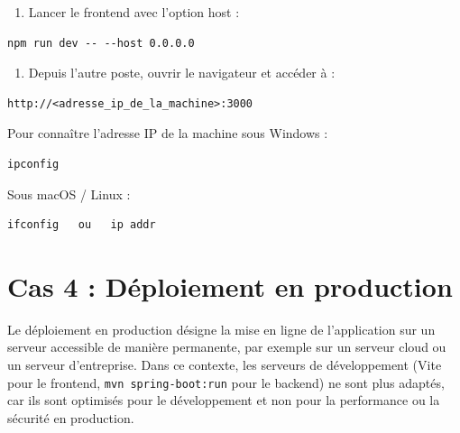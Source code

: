 \documentclass[12pt,a4paper]{report}
\begin{document}
\begin{enumerate}
    \item Lancer le frontend avec l'option host :
\end{enumerate}

\begin{verbatim}
npm run dev -- --host 0.0.0.0
\end{verbatim}

\begin{enumerate}[resume]
    \item Depuis l'autre poste, ouvrir le navigateur et accéder à :
\end{enumerate}

\begin{verbatim}
http://<adresse_ip_de_la_machine>:3000
\end{verbatim}

Pour connaître l'adresse IP de la machine sous Windows :
\begin{verbatim}
ipconfig
\end{verbatim}

Sous macOS / Linux :
\begin{verbatim}
ifconfig   ou   ip addr
\end{verbatim}

\section{Cas 4 : Déploiement en production}

Le déploiement en production désigne la mise en ligne de l'application sur un serveur accessible de manière permanente, par exemple sur un serveur cloud ou un serveur d'entreprise. Dans ce contexte, les serveurs de développement (Vite pour le frontend, \texttt{mvn spring-boot:run} pour le backend) ne sont plus adaptés, car ils sont optimisés pour le développement et non pour la performance ou la sécurité en production.
\end{document}

